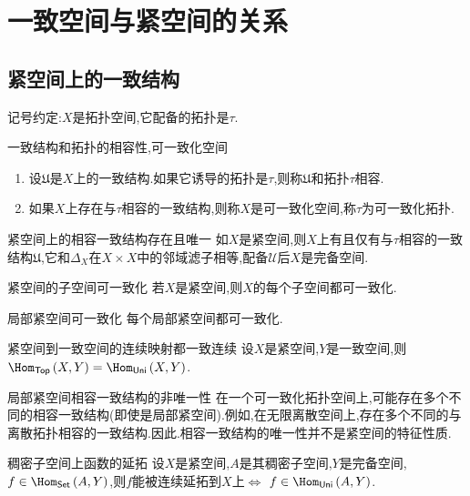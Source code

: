 \chapter{一致空间与紧空间的关系}

\section{紧空间上的一致结构}

记号约定:$X$是拓扑空间,它配备的拓扑是$\tau$.

\begin{definition}{一致结构和拓扑的相容性,可一致化空间}{}
	\begin{enumerate}
		\item 设$\mathfrak{U}$是$X$上的一致结构.如果它诱导的拓扑是$\tau$,则称$\mathfrak{U}$和拓扑$\tau$相容.
		\item 如果$X$上存在与$\tau$相容的一致结构,则称$X$是可一致化空间,称$\tau$为可一致化拓扑.
	\end{enumerate}
\end{definition}

\begin{theorem}{紧空间上的相容一致结构存在且唯一}{}
	如$X$是紧空间,则$X$上有且仅有与$\tau$相容的一致结构$\mathfrak{U}$,它和$\Delta_{X}$在$X\times X$中的邻域滤子相等,配备$\mathcal{U}$后$X$是完备空间.
\end{theorem}

\begin{corollary}{紧空间的子空间可一致化}{}
	若$X$是紧空间,则$X$的每个子空间都可一致化.
\end{corollary}

\begin{corollary}{局部紧空间可一致化}{}
	每个局部紧空间都可一致化.
\end{corollary}

\begin{theorem}{紧空间到一致空间的连续映射都一致连续}{}
	设$X$是紧空间,$Y$是一致空间,则$\Hom_{\mathsf{Top}}\left(X,Y\right)=\Hom_{\mathsf{Uni}}\left(X,Y\right)$.
\end{theorem}

\begin{remark}{局部紧空间相容一致结构的非唯一性}{}
	在一个可一致化拓扑空间上,可能存在多个不同的相容一致结构(即使是局部紧空间).例如,在无限离散空间上,存在多个不同的与离散拓扑相容的一致结构.因此.相容一致结构的唯一性并不是紧空间的特征性质.
\end{remark}

\begin{corollary}{稠密子空间上函数的延拓}{}
	设$X$是紧空间,$A$是其稠密子空间,$Y$是完备空间,$f\in\Hom_{\mathsf{Set}}\left(A,Y\right)$,则$f$能被连续延拓到$X$上$\iff$ $f\in\Hom_{\mathsf{Uni}}\left(A,Y\right)$.
\end{corollary}